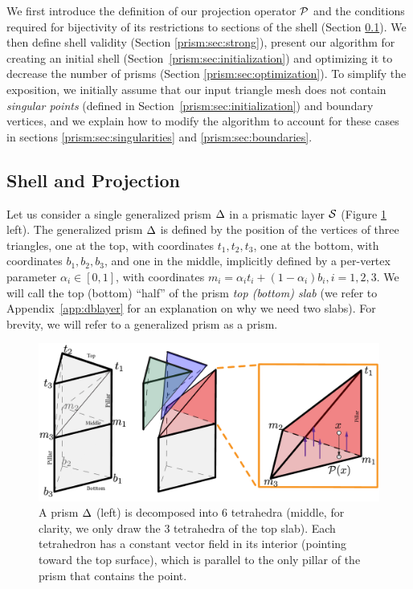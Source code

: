 We first introduce the definition of our projection operator $\P$ and the conditions required for bijectivity of its restrictions to sections of the shell (Section \ref{prism:sec:projection}). We then define shell validity (Section \ref{prism:sec:strong}), present our algorithm for creating an initial shell (Section\ \ref{prism:sec:initialization}) and optimizing it to decrease the number of prisms (Section \ref{prism:sec:optimization}).
To simplify the exposition,
we initially assume that our input triangle mesh does not contain \emph{singular points} (defined in Section~\ref{prism:sec:initialization}) and boundary vertices, and we explain how to modify the algorithm to account for these cases in sections \ref{prism:sec:singularities} and \ref{prism:sec:boundaries}.

\subsection{Shell and Projection}
\label{prism:sec:projection}

Let us consider a single generalized prism $\Prism$ in a prismatic layer $\S$ (Figure \ref{prism:fig:prism_decomposition} left). The generalized prism $\Prism$ is defined by the position of the vertices of three triangles, one at the top, with coordinates $t_1,t_2,t_3$, one at the bottom, with coordinates $b_1,b_2,b_3$, and one in the middle, implicitly defined by a per-vertex parameter $\alpha_i \in [0, 1]$, with coordinates $m_i = \alpha_i t_i + (1-\alpha_i) b_i, i=1,2,3$. We will call the top (bottom) ``half'' of the prism \emph{top (bottom) slab} (we refer to Appendix~\ref{app:dblayer} for an explanation on why we need two slabs).
For brevity, we will refer to a generalized prism as a prism.


\begin{figure}
    \includegraphics[width=\linewidth]{prism-tex/figs/prism_projection}
    \caption{A prism $\Prism$ (left) is decomposed into 6 tetrahedra (middle, for clarity, we only draw the 3 tetrahedra of the top slab). Each tetrahedron has a constant vector field in its interior (pointing toward the top surface), which is parallel to the only pillar of the prism that contains the point.}
    \label{prism:fig:prism_decomposition}
    
\end{figure}


